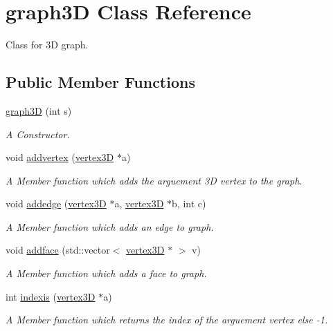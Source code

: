 \hypertarget{classgraph3D}{}\section{graph3D Class Reference}
\label{classgraph3D}


Class for 3D graph.  


\subsection*{Public Member Functions}
\begin{DoxyCompactItemize}
\item 
\hyperlink{classgraph3D_afc08df517e186ff3e3b9e7a7e1f34f44}{graph3D} (int s)
\begin{DoxyCompactList}\small\item\em A Constructor. \end{DoxyCompactList}\item 
void \hyperlink{classgraph3D_afc9caffb42c40e6f952b07295094ad57}{addvertex} (\hyperlink{classvertex3D}{vertex3D} $\ast$a)
\begin{DoxyCompactList}\small\item\em A Member function which adds the arguement 3D vertex to the graph. \end{DoxyCompactList}\item 
void \hyperlink{classgraph3D_a4f2a5e18655c4667438af55a136f381e}{addedge} (\hyperlink{classvertex3D}{vertex3D} $\ast$a, \hyperlink{classvertex3D}{vertex3D} $\ast$b, int c)
\begin{DoxyCompactList}\small\item\em A Member function which adds an edge to graph. \end{DoxyCompactList}\item 
void \hyperlink{classgraph3D_ac2d0f130cd68efe98855a21c9d253159}{addface} (std\+::vector$<$ \hyperlink{classvertex3D}{vertex3D} $\ast$ $>$ v)
\begin{DoxyCompactList}\small\item\em A Member function which adds a face to graph. \end{DoxyCompactList}\item 
int \hyperlink{classgraph3D_ae71fa4ac2b1ea51db4899ee0a57dd59c}{indexis} (\hyperlink{classvertex3D}{vertex3D} $\ast$a)
\begin{DoxyCompactList}\small\item\em A Member function which returns the index of the arguement vertex else -\/1. \end{DoxyCompactList}\item 

\end{DoxyCompactItemize}
